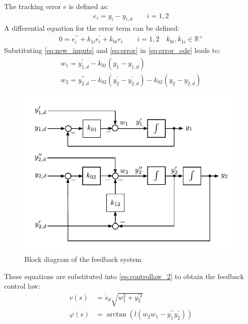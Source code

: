 \documentclass[a4paper,11pt,headings=standardclasses,parskip=half]{scrartcl}
\newcommand{\R}{\mathbb{R}} %
\begin{document}
The tracking error $e$ is defined as:
\begin{align}
\label{eq:error}
e_i = y_i-y_{i,d} \qquad i = 1,2
\end{align}
A differential equation for the error term can be defined:
\begin{align}
\label{eq:error_ode}
0 = e_i^{\prime\prime}+k_{1i}e_i^{\prime}+k_{0i}e_i \qquad i = 1,2 \quad k_{0i},k_{1i} \in \R^+
\end{align}
Substituting \eqref{eq:new_inputs} and \eqref{eq:error} in \eqref{eq:error_ode} leads to:
\begin{subequations}
\begin{align}
w_1 =  y_{1,d}^\prime - k_{01}(y_{1}-y_{1,d}) \\
w_2 = y_{2,d}^{\prime\prime}  - k_{02}(y_{2}^\prime-y_{2,d}^\prime) - k_{02}(y_{2}-y_{2,d})
\end{align}
\end{subequations}
\begin{figure}[ht]
\centering
\includegraphics[scale=1]{img/linear_system_feedback.pdf}
\caption{Block diagram of the feedback system}
\label{fig:linear_system_feedback}
\end{figure}
These equations are substituted into \eqref{eq:controllaw_2} to obtain the feedback control law:
\begin{subequations}
\begin{align}
v(s) &= \dot{s}_d\sqrt{w_1^2+y_2^{\prime 2}}\\
\varphi(s) &= \arctan\left(l (w_2w_1-y_1^{\prime\prime}y_2^\prime)\right)
\end{align}
\end{subequations}
\end{document}
